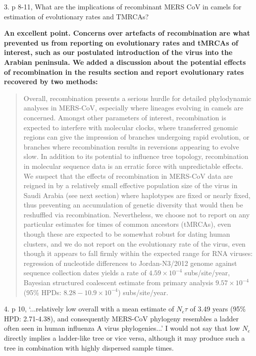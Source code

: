 \documentclass[11pt,oneside,letterpaper]{article}
\begin{document}
3. p 8-11, What are the implications of recombinant MERS CoV in camels for estimation of evolutionary rates and TMRCAs?

\textbf{An excellent point. Concerns over artefacts of recombination are what prevented us from reporting on evolutionary rates and tMRCAs of interest, such as our postulated introduction of the virus into the Arabian peninsula. We added a discussion about the potential effects of recombination in the results section and report evolutionary rates recovered by two methods:}

\begin{quotation}
Overall, recombination presents a serious hurdle for detailed phylodynamic analyses in MERS-CoV, especially where lineages evolving in camels are concerned.
Amongst other parameters of interest, recombination is expected to interfere with molecular clocks, where transferred genomic regions can give the impression of branches undergoing rapid evolution, or branches where recombination results in reversions appearing to evolve slow.
In addition to its potential to influence tree topology, recombination in molecular sequence data is an erratic force with unpredictable effects.
We suspect that the effects of recombination in MERS-CoV data are reigned in by a relatively small effective population size of the virus in Saudi Arabia (see next section) where haplotypes are fixed or nearly fixed, thus preventing an accumulation of genetic diversity that would then be reshuffled via recombination.
Nevertheless, we choose not to report on any particular estimates for times of common ancestors (tMRCAs), even though these are expected to be somewhat robust for dating human clusters, and we do not report on the evolutionary rate of the virus, even though it appears to fall firmly within the expected range for RNA viruses: regression of nucleotide differences to Jordan-N3/2012 genome against sequence collection dates yields a rate of $4.59 \times 10^{-4}$ subs/site/year, Bayesian structured coalescent estimate from primary analysis $9.57 \times 10^{-4}$ (95\% HPDs: $8.28-10.9 \times 10^{-4}$) subs/site/year.
\end{quotation}

4. p 10, `...relatively low overall with a mean estimate of $N_e\tau$ of 3.49 years (95\% HPD: 2.71-4.38), and consequently MERS-CoV phylogeny resembles a ladder often seen in human influenza A virus phylogenies...' I would not say that low $N_e$ directly implies a ladder-like tree or vice versa, although it may produce such a tree in combination with highly dispersed sample times.
\end{document}
